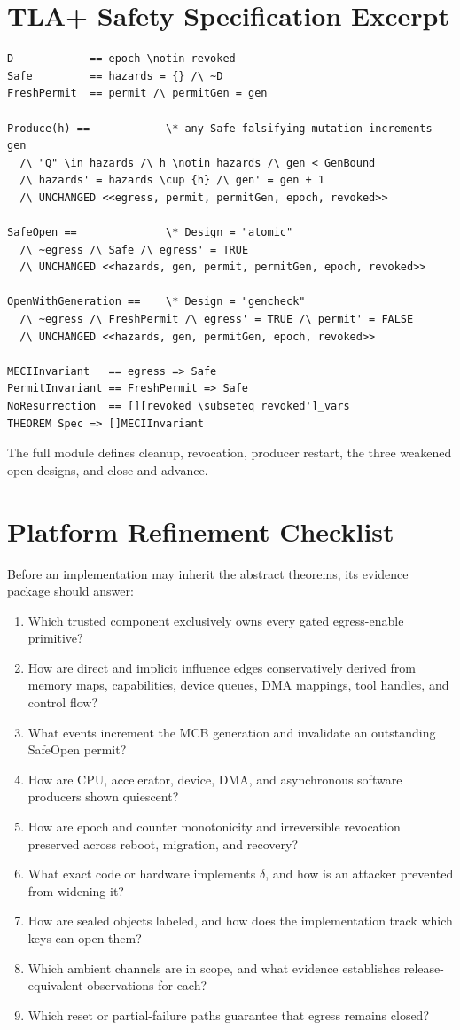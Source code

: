 \documentclass[11pt,letterpaper]{article}
\theoremstyle{plain}
\theoremstyle{definition}
\begin{document}
\section{TLA+ Safety Specification Excerpt}
\begin{small}
\begin{verbatim}
D            == epoch \notin revoked
Safe         == hazards = {} /\ ~D
FreshPermit  == permit /\ permitGen = gen

Produce(h) ==            \* any Safe-falsifying mutation increments gen
  /\ "Q" \in hazards /\ h \notin hazards /\ gen < GenBound
  /\ hazards' = hazards \cup {h} /\ gen' = gen + 1
  /\ UNCHANGED <<egress, permit, permitGen, epoch, revoked>>

SafeOpen ==              \* Design = "atomic"
  /\ ~egress /\ Safe /\ egress' = TRUE
  /\ UNCHANGED <<hazards, gen, permit, permitGen, epoch, revoked>>

OpenWithGeneration ==    \* Design = "gencheck"
  /\ ~egress /\ FreshPermit /\ egress' = TRUE /\ permit' = FALSE
  /\ UNCHANGED <<hazards, gen, permitGen, epoch, revoked>>

MECIInvariant   == egress => Safe
PermitInvariant == FreshPermit => Safe
NoResurrection  == [][revoked \subseteq revoked']_vars
THEOREM Spec => []MECIInvariant
\end{verbatim}
\end{small}
The full module defines cleanup, revocation, producer restart, the three weakened open designs, and close-and-advance.

\section{Platform Refinement Checklist}
Before an implementation may inherit the abstract theorems, its evidence package should answer:
\begin{enumerate}[leftmargin=*,itemsep=1pt]
\item Which trusted component exclusively owns every gated egress-enable primitive?
\item How are direct and implicit influence edges conservatively derived from memory maps, capabilities, device queues, DMA mappings, tool handles, and control flow?
\item What events increment the MCB generation and invalidate an outstanding SafeOpen permit?
\item How are CPU, accelerator, device, DMA, and asynchronous software producers shown quiescent?
\item How are epoch and counter monotonicity and irreversible revocation preserved across reboot, migration, and recovery?
\item What exact code or hardware implements $\delta$, and how is an attacker prevented from widening it?
\item How are sealed objects labeled, and how does the implementation track which keys can open them?
\item Which ambient channels are in scope, and what evidence establishes release-equivalent observations for each?
\item Which reset or partial-failure paths guarantee that egress remains closed?
\end{enumerate}
\end{document}
